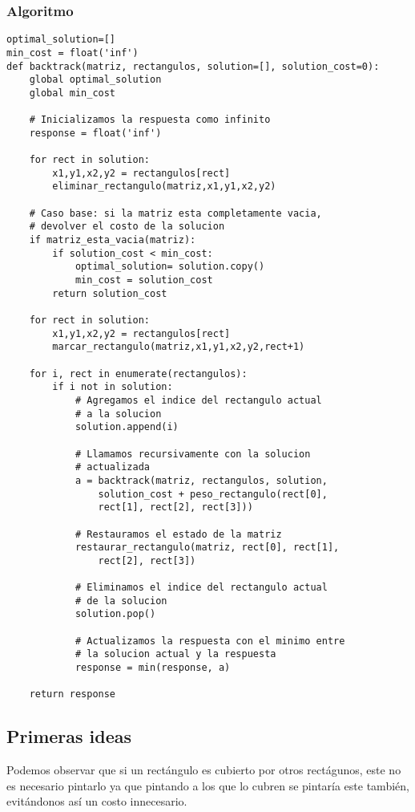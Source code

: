 \documentclass{article}
\begin{document}
	\subsubsection{Algoritmo}
	\begin{lstlisting}
optimal_solution=[]
min_cost = float('inf')
def backtrack(matriz, rectangulos, solution=[], solution_cost=0):
    global optimal_solution
    global min_cost
    
    # Inicializamos la respuesta como infinito
    response = float('inf')
    
    for rect in solution:
        x1,y1,x2,y2 = rectangulos[rect]
        eliminar_rectangulo(matriz,x1,y1,x2,y2)
        
    # Caso base: si la matriz esta completamente vacia,
    # devolver el costo de la solucion
    if matriz_esta_vacia(matriz):
        if solution_cost < min_cost:
            optimal_solution= solution.copy()
            min_cost = solution_cost
        return solution_cost
    
    for rect in solution:
        x1,y1,x2,y2 = rectangulos[rect]
        marcar_rectangulo(matriz,x1,y1,x2,y2,rect+1)
        
    for i, rect in enumerate(rectangulos):
        if i not in solution:
            # Agregamos el indice del rectangulo actual
            # a la solucion
            solution.append(i)
            
            # Llamamos recursivamente con la solucion 
            # actualizada
            a = backtrack(matriz, rectangulos, solution, 
            	solution_cost + peso_rectangulo(rect[0], 
            	rect[1], rect[2], rect[3]))
            
            # Restauramos el estado de la matriz
            restaurar_rectangulo(matriz, rect[0], rect[1], 
            	rect[2], rect[3])
            
            # Eliminamos el indice del rectangulo actual 
            # de la solucion
            solution.pop()
            
            # Actualizamos la respuesta con el minimo entre 
            # la solucion actual y la respuesta
            response = min(response, a)
    
    return response
	\end{lstlisting}
	
	\subsection{Primeras ideas}
	Podemos observar que si un rectángulo es cubierto por otros rectágunos, este no es necesario pintarlo ya que pintando a los que lo cubren se pintaría este también, evitándonos así un costo innecesario.
\end{document}
